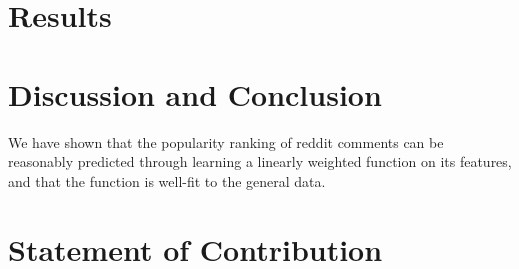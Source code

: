 \documentclass[11pt,letterpaper]{article}
\begin{document}
\section{Results}


\section{Discussion and Conclusion}


We have shown that the popularity ranking of reddit comments can be reasonably predicted through learning a linearly weighted function on its features, and that the function is well-fit to the general data.

\section{Statement of Contribution}




\end{document}
